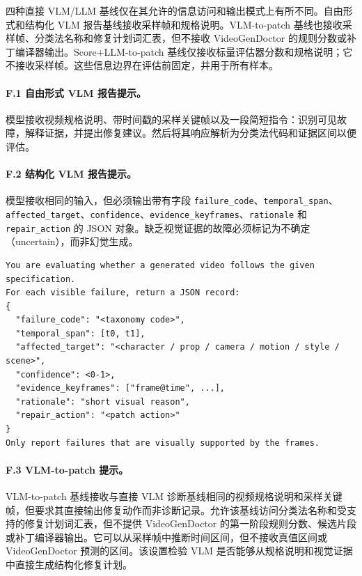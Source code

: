 \documentclass{article}
\begin{document}
四种直接 VLM/LLM 基线仅在其允许的信息访问和输出模式上有所不同。自由形式和结构化 VLM 报告基线接收采样帧和规格说明。VLM-to-patch 基线也接收采样帧、分类法名称和修复计划词汇表，但不接收 VideoGenDoctor 的规则分数或补丁编译器输出。Score+LLM-to-patch 基线仅接收标量评估器分数和规格说明；它不接收采样帧。这些信息边界在评估前固定，并用于所有样本。

\paragraph{F.1 自由形式 VLM 报告提示。}
模型接收视频规格说明、带时间戳的采样关键帧以及一段简短指令：识别可见故障，解释证据，并提出修复建议。然后将其响应解析为分类法代码和证据区间以便评估。

\paragraph{F.2 结构化 VLM 报告提示。}
模型接收相同的输入，但必须输出带有字段 \texttt{failure\_code}、\texttt{temporal\_span}、\texttt{affected\_target}、\texttt{confidence}、\texttt{evidence\_keyframes}、\texttt{rationale} 和 \texttt{repair\_action} 的 JSON 对象。缺乏视觉证据的故障必须标记为不确定（uncertain），而非幻觉生成。

\begin{verbatim}
You are evaluating whether a generated video follows the given specification.
For each visible failure, return a JSON record:
{
  "failure_code": "<taxonomy code>",
  "temporal_span": [t0, t1],
  "affected_target": "<character / prop / camera / motion / style / scene>",
  "confidence": <0-1>,
  "evidence_keyframes": ["frame@time", ...],
  "rationale": "short visual reason",
  "repair_action": "<patch action>"
}
Only report failures that are visually supported by the frames.
\end{verbatim}

\paragraph{F.3 VLM-to-patch 提示。}
VLM-to-patch 基线接收与直接 VLM 诊断基线相同的视频规格说明和采样关键帧，但要求其直接输出修复动作而非诊断记录。允许该基线访问分类法名称和受支持的修复计划词汇表，但不提供 VideoGenDoctor 的第一阶段规则分数、候选片段或补丁编译器输出。它可以从采样帧中推断时间区间，但不接收真值区间或 VideoGenDoctor 预测的区间。该设置检验 VLM 是否能够从规格说明和视觉证据中直接生成结构化修复计划。
\end{document}
